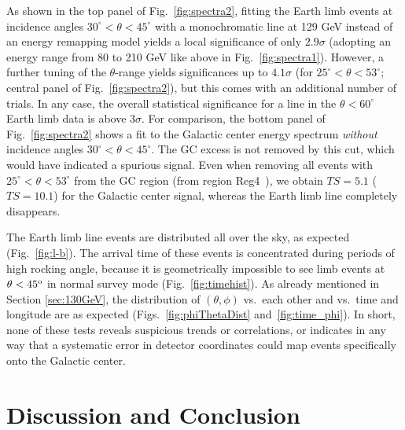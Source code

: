 \documentclass[aps,twocolumn,prd,superscriptaddress,showpacs,nofootinbib,fixfloat]{revtex4}
\newcommand{\degree}{^{\rm o}}
\begin{document}
As shown in the top panel of Fig.~\ref{fig:spectra2},
fitting the Earth limb events at
incidence angles $30^\circ<\theta<45^\circ$ with a
monochromatic line at 129 GeV instead of an energy remapping model yields a
local significance of only
$2.9\sigma$ (adopting an energy range from 80 to 210 GeV like above in
Fig.~\ref{fig:spectra1}).
However, a further tuning of the $\theta$-range yields significances up to $4.1\sigma$
(for $25^\circ<\theta<53^\circ$; central panel of Fig.~\ref{fig:spectra2}), 
but this comes with an additional number of trials.
In any case, the overall statistical
significance for a line in the $\theta<60^\circ$ Earth limb data is 
above $3\sigma$. 
For comparison, the bottom panel of Fig.~\ref{fig:spectra2} shows a fit to the Galactic center energy
spectrum \emph{without} incidence angles $30^\circ<\theta<45^\circ$. The GC
excess is not removed by this cut, which would have indicated a spurious
signal.  
Even when removing all events with
$25^\circ<\theta<53^\circ$ from the GC region (from region Reg4~\cite{Weniger:2012}),
we obtain $TS=5.1$ ($TS=10.1$) for the Galactic center signal, whereas the
Earth limb line completely disappears.

The Earth limb line events are distributed all over the sky, as expected
(Fig.~\ref{fig:l-b}).  The arrival time of these events is concentrated during
periods of high rocking angle, because it is geometrically impossible to see
limb
events at $\theta <45\degree$ in normal survey mode (Fig.~\ref{fig:timehist}).
As already mentioned in Section \ref{sec:130GeV}, the distribution of
$(\theta,\phi)$ vs.~each other and vs.~time and longitude are as expected
(Figs.~\ref{fig:phiThetaDist} and~\ref{fig:time_phi}).  In short, none of
these tests reveals suspicious trends or correlations, or indicates in any way that
a systematic error in detector coordinates could map events specifically onto
the Galactic center.



\section{Discussion and Conclusion}
\label{sec:Conclusion}
\end{document}
